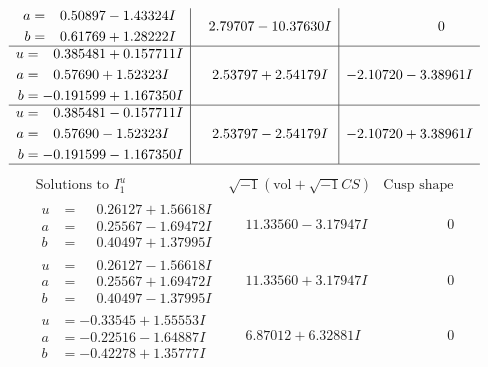\documentclass[1p]{elsarticle_modified}
\theoremstyle{definition}
\newcommand{\I}{\sqrt{-1}}
\begin{document}
$$\begin{array}{c|c|c}
\begin{aligned}
a &= \phantom{-}0.50897 - 1.43324 I \\
b &= \phantom{-}0.61769 + 1.28222 I\end{aligned}
 & \phantom{-}2.79707 - 10.37630 I & \phantom{-0.000000 } 0 \\ \hline\begin{aligned}
u &= \phantom{-}0.385481 + 0.157711 I \\
a &= \phantom{-}0.57690 + 1.52323 I \\
b &= -0.191599 + 1.167350 I\end{aligned}
 & \phantom{-}2.53797 + 2.54179 I & -2.10720 - 3.38961 I \\ \hline\begin{aligned}
u &= \phantom{-}0.385481 - 0.157711 I \\
a &= \phantom{-}0.57690 - 1.52323 I \\
b &= -0.191599 - 1.167350 I\end{aligned}
 & \phantom{-}2.53797 - 2.54179 I & -2.10720 + 3.38961 I\\
 \hline 
 \end{array}$$\newpage$$\begin{array}{c|c|c}  
\text{Solutions to }I^u_{1}& \I (\text{vol} + \sqrt{-1}CS) & \text{Cusp shape}\\
 \hline 
\begin{aligned}
u &= \phantom{-}0.26127 + 1.56618 I \\
a &= \phantom{-}0.25567 - 1.69472 I \\
b &= \phantom{-}0.40497 + 1.37995 I\end{aligned}
 & \phantom{-}11.33560 - 3.17947 I & \phantom{-0.000000 } 0 \\ \hline\begin{aligned}
u &= \phantom{-}0.26127 - 1.56618 I \\
a &= \phantom{-}0.25567 + 1.69472 I \\
b &= \phantom{-}0.40497 - 1.37995 I\end{aligned}
 & \phantom{-}11.33560 + 3.17947 I & \phantom{-0.000000 } 0 \\ \hline\begin{aligned}
u &= -0.33545 + 1.55553 I \\
a &= -0.22516 - 1.64887 I \\
b &= -0.42278 + 1.35777 I\end{aligned}
 & \phantom{-}6.87012 + 6.32881 I & \phantom{-0.000000 } 0 \\ \hline\begin{aligned}

\end{aligned}
\end{array}$$
\end{document}
